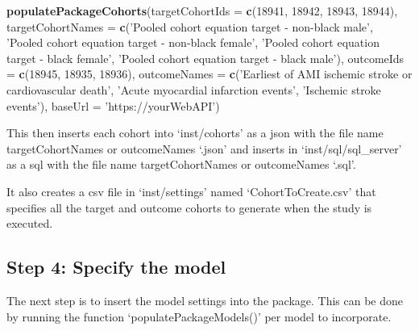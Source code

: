 \documentclass[
]{article}
\newenvironment{Shaded}{\begin{snugshade}}{\end{snugshade}}
\newcommand{\DataTypeTok}[1]{\textcolor[rgb]{0.13,0.29,0.53}{#1}}
\newcommand{\DecValTok}[1]{\textcolor[rgb]{0.00,0.00,0.81}{#1}}
\newcommand{\KeywordTok}[1]{\textcolor[rgb]{0.13,0.29,0.53}{\textbf{#1}}}
\newcommand{\NormalTok}[1]{#1}
\newcommand{\StringTok}[1]{\textcolor[rgb]{0.31,0.60,0.02}{#1}}
\begin{document}
\begin{Shaded}
\begin{Highlighting}[]
\KeywordTok{populatePackageCohorts}\NormalTok{(}\DataTypeTok{targetCohortIds =} \KeywordTok{c}\NormalTok{(}\DecValTok{18941}\NormalTok{, }\DecValTok{18942}\NormalTok{, }\DecValTok{18943}\NormalTok{, }\DecValTok{18944}\NormalTok{),}
                       \DataTypeTok{targetCohortNames =} \KeywordTok{c}\NormalTok{(}\StringTok{'Pooled cohort equation target - non-black male'}\NormalTok{,}
                                             \StringTok{'Pooled cohort equation target - non-black female'}\NormalTok{,}
                                             \StringTok{'Pooled cohort equation target - black female'}\NormalTok{,}
                                             \StringTok{'Pooled cohort equation target - black male'}\NormalTok{),}
                       \DataTypeTok{outcomeIds =} \KeywordTok{c}\NormalTok{(}\DecValTok{18945}\NormalTok{, }\DecValTok{18935}\NormalTok{, }\DecValTok{18936}\NormalTok{),}
                       \DataTypeTok{outcomeNames =} \KeywordTok{c}\NormalTok{(}\StringTok{'Earliest of AMI ischemic stroke or cardiovascular death'}\NormalTok{,}
                                       \StringTok{'Acute myocardial infarction events'}\NormalTok{,}
                                       \StringTok{'Ischemic stroke events'}\NormalTok{),}
                       \DataTypeTok{baseUrl =} \StringTok{'https://yourWebAPI'}\NormalTok{)}
\end{Highlighting}
\end{Shaded}

This then inserts each cohort into `inst/cohorts' as a json with the
file name targetCohortNames or outcomeNames `.json' and inserts in
`inst/sql/sql\_server' as a sql with the file name targetCohortNames or
outcomeNames `.sql'.

It also creates a csv file in `inst/settings' named `CohortToCreate.csv'
that specifies all the target and outcome cohorts to generate when the
study is executed.

\hypertarget{step-4-specify-the-model}{%
\subsection{Step 4: Specify the model}\label{step-4-specify-the-model}}

The next step is to insert the model settings into the package. This can
be done by running the function `populatePackageModels()' per model to
incorporate.
\end{document}
